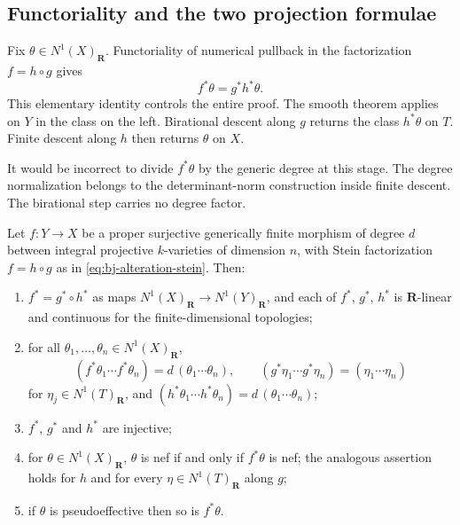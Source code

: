 \subsection{Functoriality and the two projection formulae}
\label{sec:ch42-functoriality}

Fix $\theta\in N^1(X)_{\mathbf R}$.
Functoriality of numerical pullback in the factorization $f=h\circ g$
gives
\[
                         f^*\theta=g^*h^*\theta.
\tag{42.5}\label{eq:bj-alteration-class-ledger}
\]
This elementary identity controls the entire proof.
The smooth theorem applies on $Y$ in the class on the left.
Birational descent along $g$ returns the class $h^*\theta$ on $T$.
Finite descent along $h$ then returns $\theta$ on $X$.

It would be incorrect to divide $f^*\theta$ by the generic degree at this
stage.
The degree normalization belongs to the determinant-norm construction inside
finite descent.
The birational step carries no degree factor.

\begin{lemma}
\label{lem:ch42-class-ledger}
Let $f:Y\to X$ be a proper surjective generically finite morphism of
degree $d$ between integral projective $k$-varieties of dimension $n$,
with Stein factorization $f=h\circ g$ as in
\eqref{eq:bj-alteration-stein}.  Then:
\begin{enumerate}
\item\label{itm:ch42-cl:functor}
      $f^*=g^*\circ h^*$ as maps
      $N^1(X)_{\mathbf R}\to N^1(Y)_{\mathbf R}$, and each of $f^*$,
      $g^*$, $h^*$ is $\mathbf R$-linear and continuous for the
      finite-dimensional topologies;
\item\label{itm:ch42-cl:degree}
      for all $\theta_1,\ldots,\theta_n\in N^1(X)_{\mathbf R}$,
      \[
       (f^*\theta_1\cdots f^*\theta_n)=d\,(\theta_1\cdots\theta_n),
       \qquad
       (g^*\eta_1\cdots g^*\eta_n)=(\eta_1\cdots\eta_n)
      \]
      for $\eta_j\in N^1(T)_{\mathbf R}$, and
      $(h^*\theta_1\cdots h^*\theta_n)=d\,(\theta_1\cdots\theta_n)$;
\item\label{itm:ch42-cl:inject}
      $f^*$, $g^*$ and $h^*$ are injective;
\item\label{itm:ch42-cl:nef}
      for $\theta\in N^1(X)_{\mathbf R}$, $\theta$ is nef if and
      only if $f^*\theta$ is nef; the analogous assertion holds for
      $h$ and for every $\eta\in N^1(T)_{\mathbf R}$ along $g$;
\item\label{itm:ch42-cl:psef}
      if $\theta$ is pseudoeffective then so is $f^*\theta$.
\end{enumerate}
\end{lemma}

